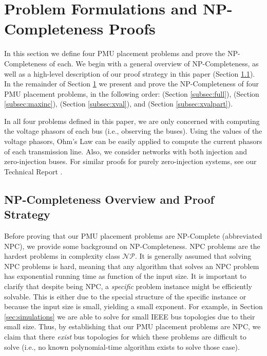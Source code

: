 \section{Problem Formulations and NP-Completeness Proofs}
\label{sec:problem-analysis}

In this section we define four PMU placement problems and prove the NP-Completeness of each. We begin with a general overview of NP-Completeness, as well as a high-level description of our proof 
strategy in this paper (Section \ref{subsec:proofstrat}). In the remainder of Section \ref{sec:problem-analysis} we present and prove the NP-Completeness of four PMU placement problems, 
in the following order: \full (Section \ref{subsec:full}), \maxinc (Section \ref{subsec:maxinc}), \xval (Section \ref{subsec:xval}), and \xvalpart (Section \ref{subsec:xvalpart}).

In all four problems defined in this paper, we are only concerned with computing the voltage phasors of each bus (i.e., observing the buses). Using the values of the voltage phasors,
Ohm's Law can be easily applied to compute the current phasors of each transmission line.
Also, we consider networks with both injection and zero-injection buses. For similar proofs for purely zero-injection systems, see our Technical Report \cite{Tech11}.

\subsection{NP-Completeness Overview and Proof Strategy}
\label{subsec:proofstrat}
Before proving that our PMU placement problems are NP-Complete (abbreviated NPC), we provide some background on NP-Completeness. NPC problems are the hardest problems in complexity class $\mathcal{NP}$. 
It is generally assumed that solving NPC problems is hard, meaning that any algorithm that solves an NPC problem has exponential running time as function of the input size. It is important to clarify that despite being NPC, a {\em specific} problem instance might be efficiently solvable. This is either due to the special structure of the specific instance or because the input size is small, yielding a small exponent. 
For example, in Section \ref{sec:simulations} we are able to solve \full for small IEEE bus topologies due to their small size. Thus, by establishing that our PMU placement problems are NPC, we claim that there {\em exist} bus 
topologies for which these problems are difficult to solve (i.e., no known polynomial-time algorithm exists to solve those case).  

